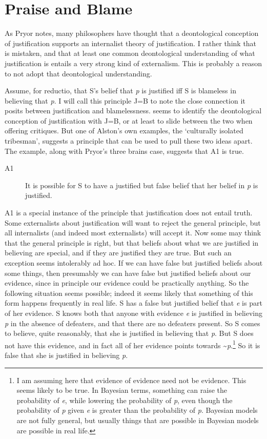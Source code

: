 \section{Praise and Blame}

As Pryor notes, many philosophers have thought that a deontological conception of justification supports an internalist theory of justification. I rather think that is mistaken, and that at least one common deontological understanding of what justification is entails a very strong kind of externalism. This is probably a reason to not adopt that deontological understanding.

Assume, for reductio, that S's belief that \textit{p} is justified iff S is blameless in believing that \textit{p}. I will call this principle J=B to note the close connection it posits between justification and blamelessness. \citet{Alston1988} seems to identify the deontological conception of justification with J=B, or at least to slide between the two when offering critiques. But one of Alston's own examples, the `culturally isolated tribesman', suggests a principle that can be used to pull these two ideas apart. The example, along with Pryor's three brains case, suggests that A1 is true.

\begin{description}
\item[A1] It is possible for S to have a justified but false belief that her belief in \textit{p} is justified.
\end{description}

\noindent A1 is a special instance of the principle that justification does not entail truth. Some externalists about justification will want to reject the general principle, but all internalists (and indeed most externalists) will accept it. Now some may think that the general principle is right, but that beliefs about what we are justified in believing are special, and if they are justified they are true. But such an exception seems intolerably ad hoc. If we can have false but justified beliefs about some things, then presumably we can have false but justified beliefs about our evidence, since in principle our evidence could be practically anything. So the following situation seems possible; indeed it seems likely that something of this form happens frequently in real life. S has a false but justified belief that \textit{e} is part of her evidence. S knows both that anyone with evidence \textit{e} is justified in believing \textit{p} in the absence of defeaters, and that there are no defeaters present. So S comes to believe, quite reasonably, that she is justified in believing that \textit{p}. But S does not have this evidence, and in fact all of her evidence points towards \~{}\textit{p}.\footnote{I am assuming here that evidence of evidence need not be evidence. This seems likely to be true. In Bayesian terms, something can raise the probability of \textit{e}, while lowering the probability of \textit{p}, even though the probability of \textit{p} given \textit{e} is greater than the probability of \textit{p}. Bayesian models are not fully general, but usually things that are possible in Bayesian models are possible in real life.} So it is false that she is justified in believing \textit{p}.

